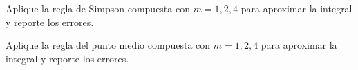 \begin{questions}
    \question

    Aplique la regla de Simpson compuesta con $m=1,2,4$ para aproximar la integral
    y reporte los errores.

    \begin{multicols}{3}

    \end{multicols}

    \question

    Aplique la regla del punto medio compuesta con $m=1,2,4$ para aproximar la integral
    y reporte los errores.

    \begin{multicols}{3}

\end{multicols}
\end{questions}
